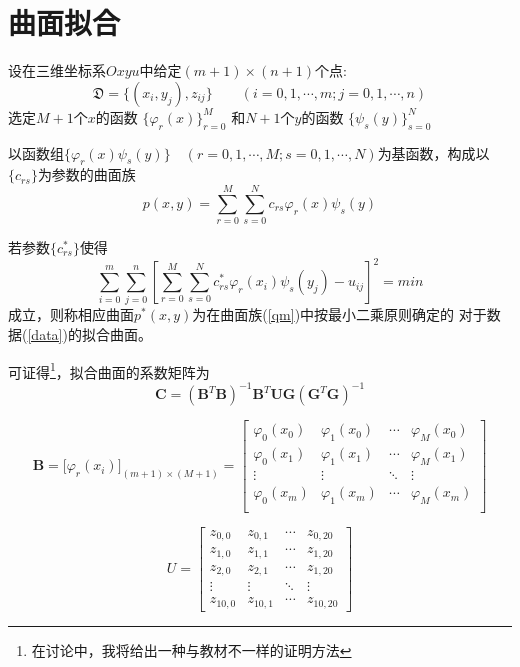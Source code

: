 \newpage
\section{曲面拟合}
\label{sec:qmnh}
设在三维坐标系$Oxyu$中给定$(m+1)\times (n+1)$个点:
\begin{equation}
\label{data}
\mathfrak{D}=\{(x_i,y_j),z_{ij}\}\qquad (i=0,1,\cdots,m;j=0,1,\cdots,n)
\end{equation}
选定$M+1$个$x$的函数
$\{\varphi_{r}(x)\}_{r=0}^M$
和$N+1$个$y$的函数
$\{\psi_{s}(y)\}_{s=0}^N$

以函数组$\{\varphi_{r}(x)\psi_{s}(y)\}\quad (r=0,1,\cdots,M;s=0,1,\cdots,N)$为基函数，构成以$\{c_{rs}\}$为参数的曲面族
\begin{equation}
\label{qmz}
p(x,y) = \sum_{r = 0}^M \sum_{s = 0}^N c_{rs}\varphi_{r}(x)\psi_{s}(y)
\end{equation}
 
若参数$\{ c^{\ast}_{rs}\}$使得
\[\sum\limits_{i = 0}^{m} {\sum\limits_{j = 0}^{n} \left[{\sum_{r = 0}^M \sum_{s = 0}^N c^{\ast}_{rs}\varphi_{r}(x_i)\psi_{s}(y_j) - u_{ij}}\right]^2} =min\]
成立，则称相应曲面$p^{\ast}(x,y)$为在曲面族(\ref{qm})中按最小二乘原则确定的
对于数据(\ref{data})的拟合曲面。

可证得\footnote{在讨论中，我将给出一种与教材不一样的证明方法}，拟合曲面的系数矩阵为
\begin{equation}
\label{c}
\bm{C}=(\bm{B}^T\bm{B})^{-1}\bm{B}^T\bm{U}\bm{G}(\bm{G}^T\bm{G})^{-1}
\end{equation}


\[\bm{B} =\big[\varphi_{r}(x_i)\big]_{(m+1)\times (M+1)}=
\begin{bmatrix}
{\varphi_{0}(x_0)}&{\varphi_{1}(x_0)}& \cdots &{\varphi_{M}(x_0)}\\
{\varphi_{0}(x_1)}&{\varphi_{1}(x_1)}& \cdots &{\varphi_{M}(x_1)}\\
 \vdots & \vdots & \ddots & \vdots \\
{\varphi_{0}(x_m)}&{\varphi_{1}(x_m)}& \cdots &{\varphi_{M}(x_m)}\\
\end{bmatrix}\]

\[U = \begin{bmatrix}
{{z_{0,0}}}&{{z_{0,1}}}& \cdots &{{z_{0,20}}}\\
{{z_{1,0}}}&{{z_{1,1}}}& \cdots &{{z_{1,20}}}\\
{{z_{2,0}}}&{{z_{2,1}}}& \cdots &{{z_{1,20}}}\\
 \vdots & \vdots & \ddots & \vdots \\
{{z_{10,0}}}&{{z_{10,1}}}& \cdots &{{z_{10,20}}}
\end{bmatrix}\]



